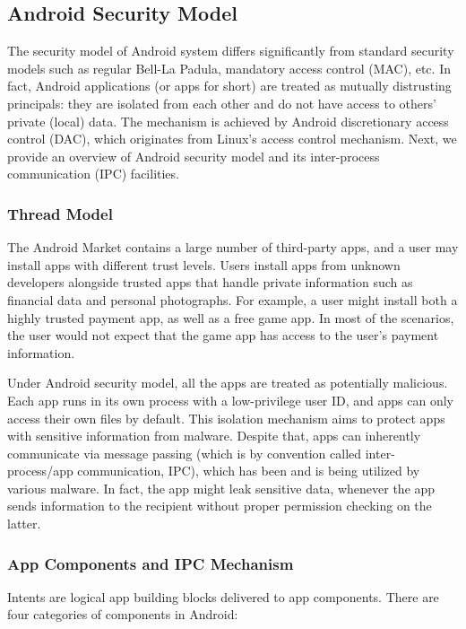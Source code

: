 \subsection{Android Security Model}
The security model of Android system differs significantly from standard security models such as regular Bell-La Padula, mandatory access control (MAC), etc. In fact, Android applications (or apps for short) are treated as mutually distrusting principals: they are isolated from each other and do not have access to others' private (local) data. The mechanism is achieved by Android discretionary access control (DAC), which originates from Linux's access control mechanism. Next, we provide an overview of Android security model and its inter-process communication (IPC) facilities.

\subsubsection{Thread Model}

The Android Market contains a large number of third-party apps, and a user may install apps with different trust levels. Users install apps from unknown developers alongside trusted apps that handle private information such as financial data and personal photographs. For example, a user might install both a highly trusted payment app, as well as a free game app. In most of the scenarios, the user would not expect that the game app has access to the user's payment information.

Under Android security model, all the apps are treated as potentially malicious. Each app runs in its own process with a low-privilege user ID, and apps can only access their own files by default. This isolation mechanism aims to protect apps with sensitive information from malware. Despite that, apps can inherently communicate via message passing (which is by convention called inter-process/app communication, IPC), which has been and is being utilized by various malware. In fact, the app might leak sensitive data, whenever the app sends information to the recipient without proper permission checking on the latter.

\subsubsection{App Components and IPC Mechanism}

Intents are logical app building blocks delivered to app components. There are four categories of components in Android:

